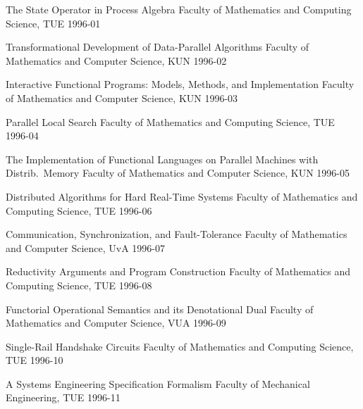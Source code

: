 \footnotesize
\setlength{\columnsep}{2em}
\begin{multicols}{2}

         {The State Operator in Process Algebra}
         {Faculty of Mathematics and Computing Science, TUE}
         {1996-01}

         {Transformational Development of Data-Parallel Algorithms}
         {Faculty of Mathematics and Computer Science, KUN}
         {1996-02}

         {Interactive Functional Programs: Models, Methods, and 
Implementation}
         {Faculty of Mathematics and Computer Science, KUN}
         {1996-03}

         {Parallel Local Search}
         {Faculty of Mathematics and Computing Science, TUE}
         {1996-04}

         {The Implementation of Functional Languages on Parallel 
Machines with Distrib.\ Memory}
         {Faculty of Mathematics and Computer Science, KUN}
         {1996-05}

         {Distributed Algorithms for Hard Real-Time Systems}
         {Faculty of Mathematics and Computing Science, TUE}
         {1996-06}

         {Communication, Synchronization, and Fault-Tolerance}
         {Faculty of Mathematics and Computer Science, UvA}
         {1996-07}

         {Reductivity Arguments and Program Construction}
         {Faculty of Mathematics and Computing Science, TUE}
         {1996-08}

         {Functorial Operational Semantics and its Denotational Dual}
         {Faculty of Mathematics and Computer Science, VUA}
         {1996-09}

         {Single-Rail Handshake Circuits}
         {Faculty of Mathematics and Computing Science, TUE}
         {1996-10}

         {A Systems Engineering Specification Formalism}
         {Faculty of Mechanical Engineering, TUE}
         {1996-11}


\end{multicols}

